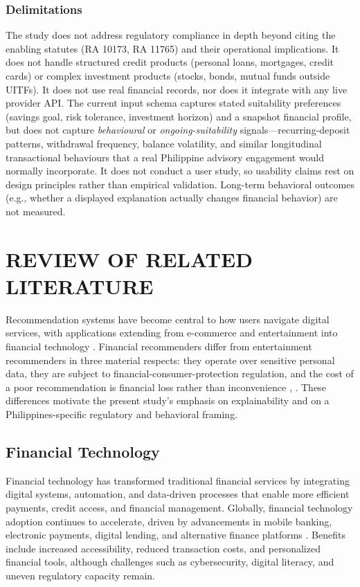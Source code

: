\documentclass[journal]{./IEEE/IEEEtran}
\begin{document}
\subsubsection{Delimitations}

The study does not address regulatory compliance in depth beyond citing the enabling statutes (RA 10173, RA 11765) and their operational implications. It does not handle structured credit products (personal loans, mortgages, credit cards) or complex investment products (stocks, bonds, mutual funds outside UITFs). It does not use real financial records, nor does it integrate with any live provider API. The current input schema captures stated suitability preferences (savings goal, risk tolerance, investment horizon) and a snapshot financial profile, but does not capture \emph{behavioural} or \emph{ongoing-suitability} signals---recurring-deposit patterns, withdrawal frequency, balance volatility, and similar longitudinal transactional behaviours that a real Philippine advisory engagement would normally incorporate. It does not conduct a user study, so usability claims rest on design principles rather than empirical validation. Long-term behavioral outcomes (e.g., whether a displayed explanation actually changes financial behavior) are not measured.


\section{REVIEW OF RELATED LITERATURE}
Recommendation systems have become central to how users navigate digital services, with applications extending from e-commerce and entertainment into financial technology \cite{ref13}. Financial recommenders differ from entertainment recommenders in three material respects: they operate over sensitive personal data, they are subject to financial-consumer-protection regulation, and the cost of a poor recommendation is financial loss rather than inconvenience \cite{ref13}, \cite{ref14}. These differences motivate the present study's emphasis on explainability and on a Philippines-specific regulatory and behavioral framing.

\subsection{Financial Technology}
Financial technology has transformed traditional financial services by integrating digital systems, automation, and data-driven processes that enable more efficient payments, credit access, and financial management. Globally, financial technology adoption continues to accelerate, driven by advancements in mobile banking, electronic payments, digital lending, and alternative finance platforms \cite{ref9}. Benefits include increased accessibility, reduced transaction costs, and personalized financial tools, although challenges such as cybersecurity, digital literacy, and uneven regulatory capacity remain.
\end{document}
